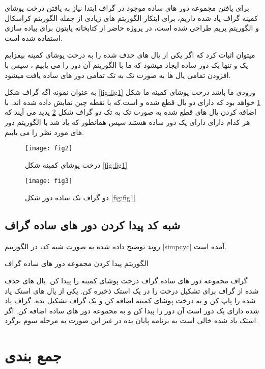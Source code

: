 برای یافتن مجموعه دور های ساده موجود در گراف ابتدا نیاز به یافتن درخت پوشای کمینه
گراف یاد شده داریم، برای اینکار الگوریتم های زیادی از جمله الگوریتم کراسکال و
الگوریتم پریم
طراحی شده است، در پروژه حاضر از کتابخانه
پایتون برای پیاده سازی استفاده شده است.

میتوان اثبات کرد که اگر یکی از یال های حذف شده را به درخت پوشای کمینه بیفزایم 
یک و تنها یک دور ساده ایجاد میشود که ما با الگوریتم
آن دور را می یابیم
، سپس با افزودن تمامی یال ها به صورت تک به تک تمامی دور های ساده یافت میشود.

به عنوان نمونه اگه گراف شکل
\ref{fig:fig1}
ورودی ما باشد درخت پوشای کمینه ما شکل
\ref{fig:fig2}
خواهد بود که دارای دو یال قطع شده
و
است.که با نقطه چین نمایش داده شده اند.
با اضافه کردن یال های قطع شده به صورت تک به تک دو گراف شکل
\ref{fig:fig3}
پدید می آیند که هر کدام دارای دارای یک دور ساده هستند سپس همانطور که یاد شد
با الگوریتم
دور های مورد نظر را می یابیم.
\begin{figure}[ht]
	\centerline{\texttt{[image: fig2]}}
	\caption{درخت پوشای کمینه شکل
	\ref{fig:fig1} }
	\label{fig:fig2}
\end{figure}

\begin{figure}[ht]
	\centerline{\texttt{[image: fig3]}}
	\caption{دو گراف تک ساده دور شکل
		\ref{fig:fig1} }
	\label{fig:fig3}
\end{figure}


\subsection{شبه کد پیدا کردن دور های ساده گراف}
روند توضیح داده شده به صورت شبه کد، در الگوریتم 
 \eqref{simpcyc}
آمده است.
\begin{algorithm}[ht]
	\onehalfspacing
	\caption{الگوریتم پیدا کردن مجموعه دور های ساده گراف} 
	\label{simpcyc}
	\begin{algorithmic}[1]
		\REQUIRE
		 گراف
		\ENSURE
		 مجموعه دور های ساده گراف
		\STATE 
		درخت پوشای کمینه را پیدا کن.
		\STATE 
		یال های حذف شده از گراف برای تشکیل درخت را در یک استک ذخیره کن.
		\STATE
		یکی از یال های استک یاد شده را پاپ کن و به درخت پوشای کمینه اضافه کن و یک گراف تشکیل بده.
		\STATE
		گراف یاد شده دارای یک دور است آن دور را پیدا کن و به محموعه دور های ساده اضافه کن.
		\STATE
		اگر استک یاد شده خالی است به برنامه پایان بده در غیر این صورت به مرحله سوم برگرد.
	\end{algorithmic}
\end{algorithm}

\section{جمع بندی}